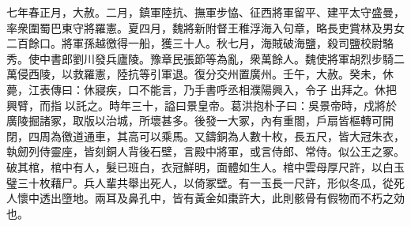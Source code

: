 \begin{pinyinscope}
七年春正月，大赦。二月，鎮軍陸抗、撫軍步恊、征西將軍留平、建平太守盛曼，率衆圍蜀巴東守將羅憲。夏四月，魏將新附督王稚浮海入句章，略長吏賞林及男女二百餘口。將軍孫越徼得一船，獲三十人。秋七月，海賊破海鹽，殺司鹽校尉駱秀。使中書郎劉川發兵廬陵。豫章民張節等為亂，衆萬餘人。魏使將軍胡烈步騎二萬侵西陵，以救羅憲，陸抗等引軍退。復分交州置廣州。壬午，大赦。癸未，休薨，江表傳曰：休寢疾，口不能言，乃手書呼丞相濮陽興入，令子𩅦出拜之。休把興臂，而指𩅦以託之。時年三十，謚曰景皇帝。葛洪抱朴子曰：吳景帝時，戍將於廣陵掘諸冢，取版以治城，所壞甚多。後發一大冢，內有重閤，戶扇皆樞轉可開閉，四周為徼道通車，其高可以乘馬。又鑄銅為人數十枚，長五尺，皆大冠朱衣，執劒列侍靈座，皆刻銅人背後石壁，言殿中將軍，或言侍郎、常侍。似公王之冢。破其棺，棺中有人，髮已班白，衣冠鮮明，面體如生人。棺中雲母厚尺許，以白玉璧三十枚藉尸。兵人輩共舉出死人，以倚冢壁。有一玉長一尺許，形似冬瓜，從死人懷中透出墮地。兩耳及鼻孔中，皆有黃金如棗許大，此則骸骨有假物而不朽之効也。


\end{pinyinscope}